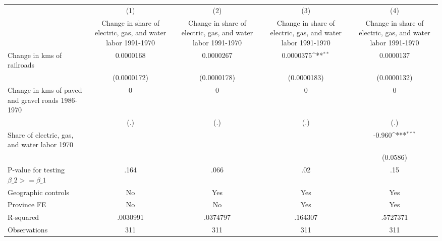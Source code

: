{
\def\sym#1{\ifmmode^{#1}\else\(^{#1}\)\fi}
\begin{tabular}{l*{4}{c}}
\hline\hline
                &\multicolumn{1}{c}{(1)}&\multicolumn{1}{c}{(2)}&\multicolumn{1}{c}{(3)}&\multicolumn{1}{c}{(4)}\\
                &\multicolumn{1}{c}{Change in share of electric, gas, and water labor 1991-1970}&\multicolumn{1}{c}{Change in share of electric, gas, and water labor 1991-1970}&\multicolumn{1}{c}{Change in share of electric, gas, and water labor 1991-1970}&\multicolumn{1}{c}{Change in share of electric, gas, and water labor 1991-1970}\\
\hline
Change in kms of railroads&0.0000168         &0.0000267         &0.0000375\sym{**} &0.0000137         \\
                &(0.0000172)         &(0.0000178)         &(0.0000183)         &(0.0000132)         \\
[1em]
Change in kms of paved and gravel roads 1986-1970&        0         &        0         &        0         &        0         \\
                &      (.)         &      (.)         &      (.)         &      (.)         \\
[1em]
Share of electric, gas, and water labor 1970&                  &                  &                  &   -0.960\sym{***}\\
                &                  &                  &                  & (0.0586)         \\
\hline
P-value for testing $\beta\_{2} >= \beta\_{1}$&     .164         &     .066         &      .02         &      .15         \\
Geographic controls&       No         &      Yes         &      Yes         &      Yes         \\
Province FE     &       No         &       No         &      Yes         &      Yes         \\
R-squared       & .0030991         & .0374797         &  .164307         & .5727371         \\
Observations    &      311         &      311         &      311         &      311         \\
\hline\hline
\end{tabular}
}
